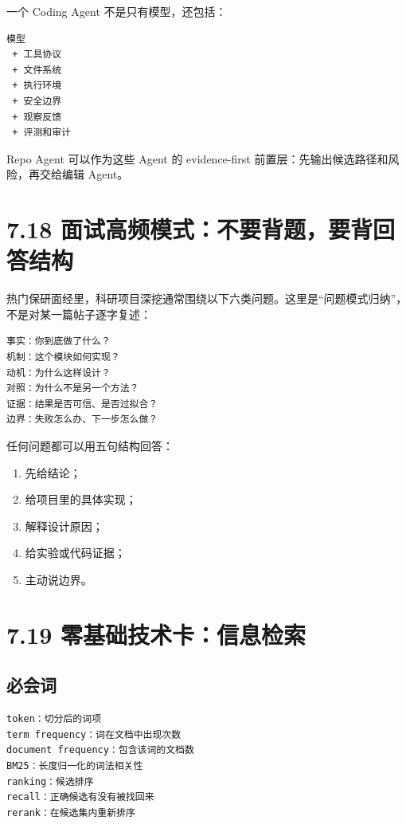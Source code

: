 \documentclass[UTF8,12pt,openany]{ctexbook}
\begin{document}
一个 Coding Agent 不是只有模型，还包括：\par

\begin{lstlisting}
模型
 + 工具协议
 + 文件系统
 + 执行环境
 + 安全边界
 + 观察反馈
 + 评测和审计
\end{lstlisting}

Repo Agent 可以作为这些 Agent 的 evidence-first 前置层：先输出候选路径和风险，再交给编辑 Agent。\par

\section{7.18 面试高频模式：不要背题，要背回答结构}

热门保研面经里，科研项目深挖通常围绕以下六类问题。这里是“问题模式归纳”，不是对某一篇帖子逐字复述：\par

\begin{lstlisting}
事实：你到底做了什么？
机制：这个模块如何实现？
动机：为什么这样设计？
对照：为什么不是另一个方法？
证据：结果是否可信、是否过拟合？
边界：失败怎么办、下一步怎么做？
\end{lstlisting}

任何问题都可以用五句结构回答：\par

\begin{enumerate}
\item 先给结论；
\item 给项目里的具体实现；
\item 解释设计原因；
\item 给实验或代码证据；
\item 主动说边界。
\end{enumerate}

\section{7.19 零基础技术卡：信息检索}

\subsection{必会词}

\begin{lstlisting}
token：切分后的词项
term frequency：词在文档中出现次数
document frequency：包含该词的文档数
BM25：长度归一化的词法相关性
ranking：候选排序
recall：正确候选有没有被找回来
rerank：在候选集内重新排序
\end{lstlisting}
\end{document}

